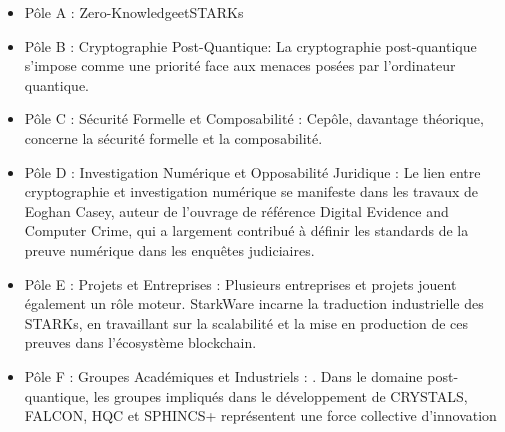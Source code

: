 \documentclass{article}
\begin{document}
\begin{itemize}

\item   Pôle A : Zero-KnowledgeetSTARKs

\item  Pôle B : Cryptographie Post-Quantique:  La cryptographie post-quantique s’impose comme une priorité face aux menaces posées par l’ordinateur quantique.

\item   Pôle C : Sécurité Formelle et Composabilité : Cepôle, davantage théorique, concerne la sécurité formelle et la composabilité.

\item   Pôle D : Investigation Numérique et Opposabilité Juridique : Le lien entre cryptographie et investigation numérique se manifeste dans les travaux de Eoghan
 Casey, auteur de l’ouvrage de référence Digital Evidence and Computer Crime, qui a largement
 contribué à définir les standards de la preuve numérique dans les enquêtes judiciaires.

\item    Pôle E : Projets et Entreprises :  Plusieurs entreprises et projets jouent également un rôle moteur. StarkWare incarne la traduction
 industrielle des STARKs, en travaillant sur la scalabilité et la mise en production de ces preuves
 dans l’écosystème blockchain.

\item   Pôle F : Groupes Académiques et Industriels : . Dans le domaine post-quantique, les groupes impliqués
 dans le développement de CRYSTALS, FALCON, HQC et SPHINCS+ représentent une force collective d’innovation
  

\end{itemize}
\end{document}

